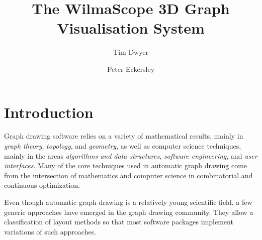 \documentclass[runningheads]{cl2emult}
\begin{document}
%
\title*{The WilmaScope 3D Graph Visualisation System}
%
%
%
%
%
\author{Tim Dwyer
\and Peter Eckersley
}
%
%
%

\maketitle              %


\section{Introduction}\label{sec:intro}
%
Graph drawing software relies on a variety of mathematical results,
mainly in \emph{graph theory},
\emph{topology}, and \emph{geometry},
as well as computer science techniques, mainly in the areas
\emph{algorithms and data structures}, \emph{software engineering}, and \emph{user interfaces}.
Many of the core techniques used in automatic graph drawing come from
the intersection of mathematics and computer science in combinatorial
and continuous optimization.

Even though automatic graph drawing is a relatively young scientific
field, a few generic approaches have emerged in the graph drawing
community. They allow a classification of layout methods so that most
software packages implement variations of such approaches.
\end{document}
